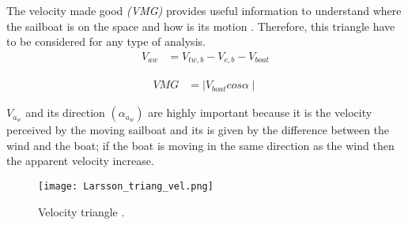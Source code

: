 The velocity made good \textit{(VMG)} provides useful information to understand where the sailboat is on the space and how is its motion \cite{larsonprinciples}. Therefore, this triangle have to be considered for any type of analysis.\\
\begin{equation}
\label{eq_vel}
\begin{aligned}
V_{aw} & = V_{tw,b} - V_{c,b} - V_{boat}
\end{aligned}
\end {equation}

\begin{equation}
\label{eq:VMG}
\begin{aligned}
VMG &=  \mid V_{boat} cos \alpha  \mid 
\end{aligned}
\end {equation}

$V_a_w$ and its direction $( \alpha_a_w)$ are highly important because it is the velocity perceived by the moving sailboat and its is given by the difference between the wind and the boat; if the boat is moving in the same direction as the wind then the apparent velocity increase. \\

\begin{figure}[h]
\centering
  \texttt{[image: Larsson\_triang\_vel.png]}
 \caption{Velocity triangle  \cite{larsonprinciples}. }
\label{vel_triangle}
\end{figure}

